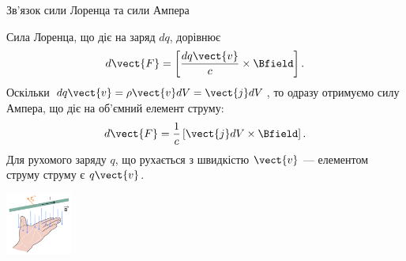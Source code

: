\documentclass{beamer}
\begin{document}
\begin{frame}{Зв'язок сили Лоренца та сили Ампера}{}
	\begin{block}{}
		Сила Лоренца, що діє на заряд $dq$, дорівнює
		\begin{equation*}
			d\vect{F} = \left[\frac{dq \vect{v}}{c}\times\Bfield\right].
		\end{equation*}
		Оскільки $dq \vect{v} = \rho \vect{v} dV = \vect{j} dV$, то одразу отримуємо силу Ампера, що діє на об'ємний елемент струму:
		\begin{equation*}
			d\vect{F} = \frac1c \left[ \vect{j}dV \times \Bfield\right].
		\end{equation*}
		Для рухомого заряду $q$, що рухається з швидкістю $\vect{v}$ --- \alert{елементом струму струму є $q\vect{v}$}.
	\end{block}
	\begin{center}
		\includegraphics[width=2.2cm]{LeftHandRule}
	\end{center}
\end{frame}
\end{document}

